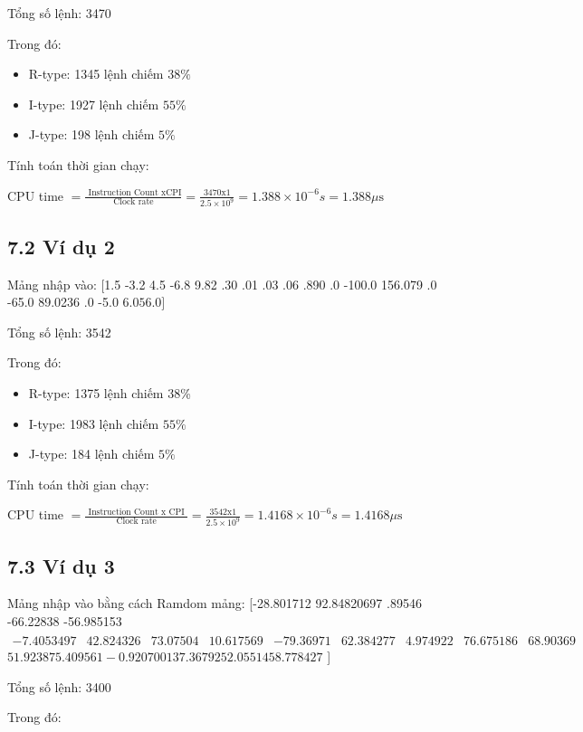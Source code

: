 \documentclass[a4paper]{article}
\begin{document}
Tổng số lệnh: 3470

Trong đó:

\begin{itemize}
  \item R-type: 1345 lệnh chiếm $38 \%$
  \item I-type: 1927 lệnh chiếm $55 \%$
  \item J-type: 198 lệnh chiếm $5 \%$
\end{itemize}

Tính toán thời gian chạy:

CPU time $=\frac{\text { Instruction Count } \mathrm{x} \mathrm{CPI}}{\text { Clock rate }}=\frac{3470 \mathrm{x} 1}{2.5 \times 10^{9}}=1.388 \times 10^{-6} s=1.388 \mu \mathrm{s}$

\subsection*{7.2 Ví dụ 2}
Mảng nhập vào: [1.5 -3.2 4.5 -6.8 9.82 .30 .01 .03 .06 .890 .0 -100.0 156.079 .0 -65.0 89.0236 .0 -5.0 $6.056 .0]$

Tổng số lệnh: 3542

Trong đó:

\begin{itemize}
  \item R-type: 1375 lệnh chiếm 38\%
  \item I-type: 1983 lệnh chiếm $55 \%$
  \item J-type: 184 lệnh chiếm $5 \%$
\end{itemize}

Tính toán thời gian chạy:

$\mathrm{CPU}$ time $=\frac{\text { Instruction Count } \mathrm{x} \text { CPI }}{\text { Clock rate }}=\frac{3542 \mathrm{x} 1}{2.5 \times 10^{9}}=1.4168 \times 10^{-6} s=1.4168 \mu \mathrm{s}$

\subsection*{7.3 Ví dụ 3}
Mảng nhập vào bằng cách Ramdom mảng: [-28.801712 92.84820697 .89546 -66.22838 -56.985153 $\begin{array}{lllllllll}-7.4053497 & 42.824326 & 73.07504 & 10.617569 & -79.36971 & 62.384277 & 4.974922 & 76.675186 & 68.90369\end{array}$ $51.923875 .409561-0.920700137 .3679252 .0551458 .778427$ ]

Tổng số lệnh: 3400

Trong đó:
\end{document}
